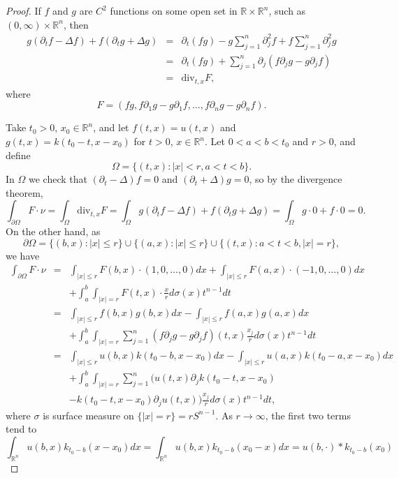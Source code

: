 \documentclass{article}
\renewcommand{\div}{\mathrm{div}}
\begin{document}
\begin{proof}
If $f$ and $g$ are $C^2$ functions on some open set in $\mathbb{R} \times \mathbb{R}^n$, such as $(0,\infty) \times \mathbb{R}^n$, then
\begin{eqnarray*}
g(\partial_t f - \Delta f) + f(\partial_t g +\Delta g) &= &\partial_t(fg)-g\sum_{j=1}^n \partial_j^2 f + f \sum_{j=1}^n \partial_j^2 g\\
&=&\partial_t(fg) +\sum_{j=1}^n \partial_j(f\partial_j g-g\partial_j f)\\
&=&\div_{t,x} F,
\end{eqnarray*}
where 
\[
F=(fg, f\partial_1 g -g\partial_1 f,\ldots,f\partial_n g-g\partial_n f).
\]

Take $t_0>0$, $x_0 \in \mathbb{R}^n$, and let $f(t,x)=u(t,x)$ and $g(t,x)=k(t_0-t,x-x_0)$ for
$t >0$, $x \in \mathbb{R}^n$. Let $0<a<b<t_0$ and $r>0$, and define
\[
\Omega = \{(t,x):|x|<r, a<t<b\}.
\]
In $\Omega$ we check that $(\partial_t-\Delta)f=0$ and $(\partial_t + \Delta)g=0$, so
by the divergence theorem,
\[
\int_{\partial \Omega} F\cdot \nu = \int_\Omega \div_{t,x} F = \int_\Omega  g(\partial_t f - \Delta f) + f(\partial_t g +\Delta g) = 
\int_{\Omega} g \cdot 0 + f \cdot 0 = 0.
\]
On the other hand,
as
\[
\partial \Omega =  \{(b,x): |x| \leq r\}  \cup \{(a,x): |x| \leq r\} \cup \{(t,x): a<t<b, |x|=r\}, 
\]
we have
\begin{eqnarray*}
\int_{\partial \Omega} F\cdot \nu&=&\int_{|x| \leq r} F(b,x) \cdot (1,0,\ldots,0) dx +\int_{|x| \leq r} F(a,x) \cdot (-1,0,\ldots,0) dx\\
&&+\int_a^b \int_{|x|=r} F(t,x)\cdot \frac{x}{r} d\sigma(x) t^{n-1} dt\\
&=&\int_{|x| \leq r} f(b,x)g(b,x) dx - \int_{|x| \leq r} f(a,x)g(a,x) dx\\
&&+\int_a^b \int_{|x|=r} \sum_{j=1}^n (f \partial_j g-g \partial_j f)(t,x)\frac{x_j}{r} d\sigma(x) t^{n-1} dt\\
&=&\int_{|x| \leq r} u(b,x) k(t_0-b,x-x_0) dx - \int_{|x| \leq r} u(a,x) k(t_0-a,x-x_0) dx\\
&&+\int_a^b \int_{|x|=r} \sum_{j=1}^n \Big(u(t,x) \partial_j k(t_0-t,x-x_0) \\
&&- k(t_0-t,x-x_0) \partial_j u(t,x)\Big) \frac{x_j}{r} d\sigma(x) t^{n-1} dt,
\end{eqnarray*}
where $\sigma$ is surface measure on $\{|x|=r\}=rS^{n-1}$.  As $r \to \infty$, the first two terms tend to
\[
\int_{\mathbb{R}^n} u(b,x) k_{t_0-b}(x-x_0) dx = \int_{\mathbb{R}^n} u(b,x) k_{t_0-b}(x_0-x) dx
=u(b,\cdot)*k_{t_0-b}(x_0)
\]
\end{proof}
\end{document}
